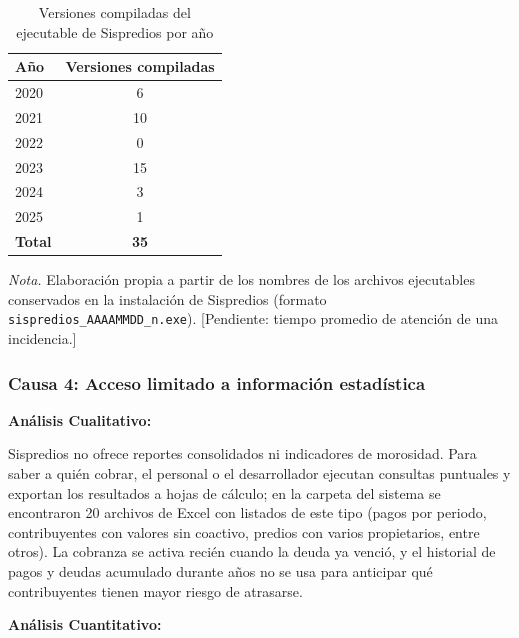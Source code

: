 \documentclass[12pt,a4paper]{report}
\begin{document}
\begin{table}[H]
\centering
\caption{Versiones compiladas del ejecutable de Sispredios por año}
\label{tab:causa3}
\begin{tabular}{lc}
\toprule
\textbf{Año} & \textbf{Versiones compiladas} \\
\midrule
2020 & 6 \\
2021 & 10 \\
2022 & 0 \\
2023 & 15 \\
2024 & 3 \\
2025 & 1 \\
\midrule
\textbf{Total} & \textbf{35} \\
\bottomrule
\end{tabular}

\vspace{0.3cm}
\footnotesize\textit{Nota.} Elaboración propia a partir de los nombres de los archivos ejecutables conservados en la instalación de Sispredios (formato \texttt{sispredios\_AAAAMMDD\_n.exe}). [Pendiente: tiempo promedio de atención de una incidencia.]
\end{table}

\subsubsection*{Causa 4: Acceso limitado a información estadística}

\textbf{Análisis Cualitativo:}

Sispredios no ofrece reportes consolidados ni indicadores de morosidad. Para saber a quién cobrar, el personal o el desarrollador ejecutan consultas puntuales y exportan los resultados a hojas de cálculo; en la carpeta del sistema se encontraron 20 archivos de Excel con listados de este tipo (pagos por periodo, contribuyentes con valores sin coactivo, predios con varios propietarios, entre otros). La cobranza se activa recién cuando la deuda ya venció, y el historial de pagos y deudas acumulado durante años no se usa para anticipar qué contribuyentes tienen mayor riesgo de atrasarse.

\textbf{Análisis Cuantitativo:}
\end{document}
